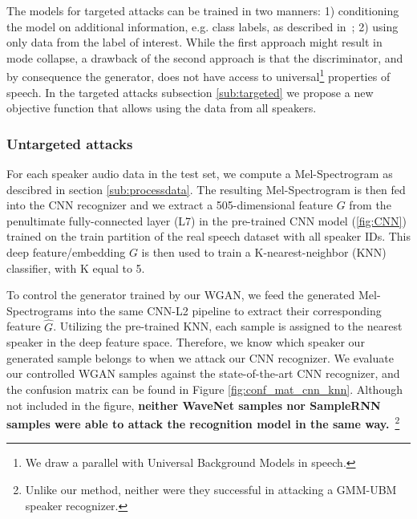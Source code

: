 The models for targeted attacks can be trained in two manners: 1) 
conditioning the model on additional information, e.g. class labels, as
described in~\cite{mirza2014conditional}; 2) using only data from the label 
of interest. While the first approach might result in mode collapse, a drawback
of the second approach is that the discriminator, and by consequence the
generator, does not have access to universal\footnote{We draw a parallel with 
Universal Background Models in speech.} properties of speech. In the targeted 
attacks subsection \ref{sub:targeted} we propose a new objective function that allows 
using the data from all speakers.  

\subsubsection{Untargeted attacks}
\label{sub:untargeted}
For each speaker audio data in the test set, we compute a Mel-Spectrogram as
descibred in section \ref{sub:processdata}. The resulting Mel-Spectrogram is
then fed into the CNN recognizer and we extract a 505-dimensional feature $G$ from
the penultimate fully-connected layer (L7) in the pre-trained CNN model
(\ref{fig:CNN}) trained on the train partition of the real speech dataset with all 
speaker IDs.  This deep feature/embedding $G$ is then used to train a 
K-nearest-neighbor (KNN) classifier, with K equal to 5.

To control the generator trained by our WGAN, we feed the generated
Mel-Spectrograms into the same CNN-L2 pipeline to extract their corresponding
feature $\widehat G$. Utilizing the pre-trained KNN, each sample is assigned to
the nearest speaker in the deep feature space. Therefore, we know which speaker
our generated sample belongs to when we attack our CNN recognizer. We evaluate our
controlled WGAN samples against the state-of-the-art CNN recognizer, and the
confusion matrix can be found in Figure \ref{fig:conf_mat_cnn_knn}. Although not
included in the figure, \textbf{neither WaveNet samples nor SampleRNN samples
were able to attack the recognition model in the same way.}~\footnote{Unlike our
method, neither were they successful in attacking a GMM-UBM speaker recognizer.}



